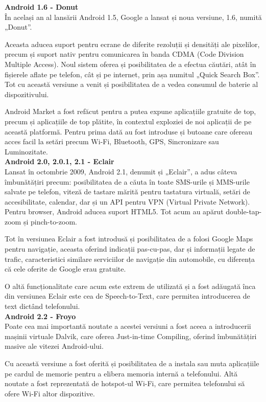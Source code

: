 \documentclass[12pt,a4paper]{article}
\begin{document}
\textbf{Android 1.6 - Donut}\\
În același an al lansării Android 1.5, Google a lansat și noua versiune, 1.6, numită „Donut”.
	
	Aceasta aducea suport pentru ecrane de diferite rezoluții și densități ale pixelilor, precum și suport nativ pentru comunicarea în banda CDMA (Code Division Multiple Access). Noul sistem oferea și posibilitatea de a efectua căutări, atât în fișierele aflate pe telefon, cât și pe internet, prin așa numitul „Quick Search Box”. Tot cu această versiune a venit și posibilitatea de a vedea consumul de baterie al dispozitivului.
	
	Android Market a fost refăcut pentru a putea expune aplicațiile gratuite de top, precum și aplicațiile de top plătite, în contextul exploziei de noi aplicații de pe această platformă. Pentru prima dată au fost introduse și butoane care ofereau acces facil la setări precum Wi-Fi, Bluetooth, GPS, Sincronizare sau Luminozitate.\\

\textbf{Android 2.0, 2.0.1, 2.1 - Eclair}\\
Lansat în octombrie 2009, Android 2.1, denumit și „Eclair”, a adus câteva îmbunătățiri precum: posibilitatea de a căuta în toate SMS-urile și MMS-urile salvate pe telefon, viteză de tastare mărită pentru tastatura virtuală, setări de accesibilitate, calendar, dar și un API pentru VPN (Virtual Private Network). Pentru browser, Android aducea suport HTML5. Tot acum au apărut double-tap-zoom și pinch-to-zoom.
	
	Tot în versiunea Eclair a fost introdusă și posibilitatea de a folosi Google Maps pentru navigație, aceasta oferind indicații pas-cu-pas, dar și informații legate de trafic, caracteristici similare serviciilor de navigație din automobile, cu diferența că cele oferite de Google erau gratuite.

	O altă funcționalitate care acum este extrem de utilizată și a fost adăugată înca din versiunea Eclair este cea de Speech-to-Text, care permitea introducerea de text dictând telefonului.\\
	
\textbf{Android 2.2 - Froyo}\\
Poate cea mai importantă noutate a acestei versiuni a fost aceea a introducerii mașinii virtuale Dalvik, care oferea Just-in-time Compiling, oferind îmbunătățiri masive ale vitezei Android-ului.

	Cu această versiune a fost oferită și posibilitatea de a instala sau muta aplicațiile pe cardul de memorie pentru a elibera memoria internă a telefonului. Altă noutate a fost reprezentată de hotspot-ul Wi-Fi, care permitea telefonului să ofere Wi-Fi altor dispozitive.
\end{document}
